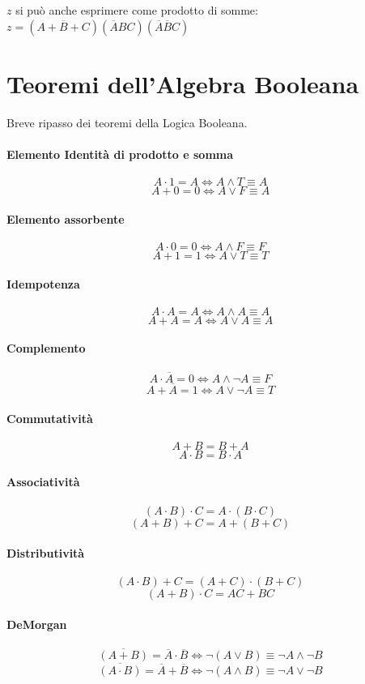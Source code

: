 $ z $ si può anche esprimere come prodotto di somme: $ z = (A+\overbar{B}+C)(\overbar{A}BC)(\overbar{A}\overbar{B}C) $


\section{Teoremi dell'Algebra Booleana}
Breve ripasso dei teoremi della Logica Booleana.
\paragraph{Elemento Identità di prodotto e somma}
\[ A \cdot 1 = A \iff A \land T \equiv A\]
\[ A + 0 = 0 \iff A \lor F \equiv A\]
\paragraph{Elemento assorbente}
\[ A \cdot 0 = 0 \iff A \land F \equiv F \]
\[ A + 1 = 1 \iff A \lor T \equiv T \]
\paragraph{Idempotenza}
\[ A \cdot A = A \iff A \land A \equiv A \]
\[ A + A = A \iff A \lor A \equiv A \]
\paragraph{Complemento}
\[ A \cdot \overbar{A} = 0 \iff A \land \lnot A \equiv F \]
\[ A + \overbar{A} = 1 \iff A \lor \lnot A \equiv T \]
\paragraph{Commutatività}
\[ A + B = B + A \]
\[ A \cdot B = B \cdot A \]
\paragraph{Associatività}
\[ (A \cdot B) \cdot C = A \cdot (B \cdot C) \]
\[ (A + B) + C = A + (B + C) \]
\paragraph{Distributività}
\[ (A \cdot B) + C = (A+C) \cdot (B+C) \]
\[ (A+B) \cdot C = AC + BC \]
\paragraph{DeMorgan}
\[ \overbar{(A + B)} = \overbar{A} \cdot \overbar{B} \iff \lnot(A \lor B )\equiv \lnot A \land \lnot B \]
\[ \overbar{(A \cdot B)} = \overbar{A} + \overbar{B} \iff \lnot(A \land B )\equiv \lnot A \lor \lnot B \]

